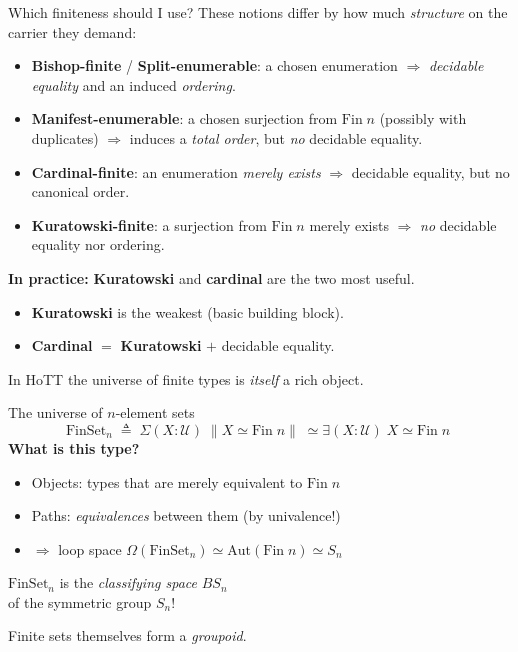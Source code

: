 \documentclass[aspectratio=169,12pt]{beamer}
\newcommand{\trunc}[1]{\lVert #1 \rVert}
\newcommand{\U}{\mathcal{U}}
\newcommand{\Fin}{\mathrm{Fin}}
\begin{document}
\begin{frame}{Which finiteness should I use?}
  These notions differ by how much \emph{structure} on the carrier
  they demand:
  \begin{itemize}
    \item \textbf{Bishop-finite} / \textbf{Split-enumerable}: a chosen
          enumeration $\Rightarrow$ \emph{decidable equality} and an
          induced \emph{ordering}.
    \item \textbf{Manifest-enumerable}: a chosen surjection from
          $\Fin\;n$ (possibly with duplicates) $\Rightarrow$ induces a
          \emph{total order}, but \emph{no} decidable equality.
    \item \textbf{Cardinal-finite}: an enumeration \emph{merely exists}
          $\Rightarrow$ decidable equality, but no canonical order.
    \item \textbf{Kuratowski-finite}: a surjection from $\Fin\;n$
          merely exists $\Rightarrow$ \emph{no} decidable equality nor ordering.
  \end{itemize}
  \pause\medskip

  \textbf{In practice:} \textbf{Kuratowski} and \textbf{cardinal} are the
  two most useful.
  \begin{itemize}
    \item \textbf{Kuratowski} is the weakest (basic building block).
    \item \textbf{Cardinal} $=$ \textbf{Kuratowski} $+$ decidable equality.
  \end{itemize}
  \pause\medskip

  In HoTT the universe of finite types is \emph{itself} a rich object.
\end{frame}

\begin{frame}{The universe of $n$-element sets}
  \[
    \mathrm{FinSet}_n \;\triangleq\;
    \Sigma(X : \U)\; \trunc{X \simeq \Fin\;n}\;
    \simeq \exists(X : \U)\; X \simeq \Fin\;n\;
  \]
  \pause\medskip
  \textbf{What is this type?}
  \begin{itemize}
    \item Objects: types that are merely equivalent to $\Fin\;n$
    \item Paths: \emph{equivalences} between them (by univalence!)
    \item $\Rightarrow$ loop space $\Omega(\mathrm{FinSet}_n) \simeq \mathrm{Aut}(\Fin\;n) \simeq S_n$
  \end{itemize}
  \pause\medskip
  \begin{center}
    $\mathrm{FinSet}_n$ is the \emph{classifying space} $B S_n$ \\
    of the symmetric group $S_n$!
  \end{center}
  \pause\medskip
  Finite sets themselves form a \emph{groupoid}.
\end{frame}
\end{document}
